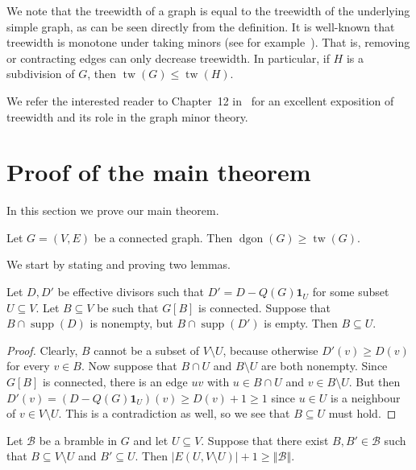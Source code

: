 \documentclass[ALCO,ThmDefs,Unicode,epreuves]{cedram}
\newcommand{\one}{\ensuremath{\mathbf{1}}}
\DeclareMathOperator{\tw}{tw}
\DeclareMathOperator{\dgon}{dgon}
\DeclareMathOperator{\supp}{supp}
\newcommand*{\B}{\mathcal{B}}
\newcommand*{\order}[1]{\left\Vert#1\right\Vert}
\begin{document}
\begin{rema}
We note that the treewidth of a graph is equal to the treewidth of the underlying simple graph, as can be seen directly from the definition. It is well-known that treewidth is monotone under taking minors (see for example~\cite{DiestelGraphTheory}). That is, removing or contracting edges can only decrease treewidth. In particular, if $H$ is a subdivision of $G$, then $\tw(G)\leq \tw(H)$. 


\end{rema}
We refer the interested reader to Chapter~12 in~\cite{DiestelGraphTheory} for an excellent exposition of treewidth and its role in the graph minor theory.

\section{Proof of the main theorem}
In this section we prove our main theorem.
\begin{theorem}\label{main}
Let $G=(V,E)$ be a connected graph. Then $\dgon(G)\geq \tw(G)$.
\end{theorem} 

We start by stating and proving two lemmas.
\begin{lemma}\label{oneside}
Let $D,D'$ be effective divisors such that $D'=D-Q(G)\one_U$ for some subset $U\subseteq V$. Let $B\subseteq V$ be such that $G[B]$ is connected. Suppose that $B\cap \supp(D)$ is nonempty, but $B\cap \supp(D')$ is empty. Then $B\subseteq U$.
\end{lemma}
\begin{proof}
Clearly, $B$ cannot be a subset of $V\setminus U$, because otherwise $D'(v)\geq D(v)$ for every $v\in B$. Now suppose that $B\cap U$ and $B\setminus U$ are both nonempty. Since $G[B]$ is connected, there is an edge $uv$ with $u\in B\cap U$ and $v\in B\setminus U$. But then $D'(v)=(D-Q(G)\one_U)(v)\geq D(v)+1\geq 1$ since $u\in U$ is a neighbour of $v\in V\setminus U$. This is a contradiction as well, so we see that $B\subseteq U$ must hold.
\end{proof}

\begin{lemma}\label{brambleseparation}
Let $\B$ be a bramble in $G$ and let $U\subseteq V$. Suppose that there exist $B,B'\in \B$ such that $B\subseteq V\setminus U$ and $B'\subseteq U$. Then $|E(U,V\setminus U)|+1\geq \order{\B}$.
\end{lemma}
\end{document}
